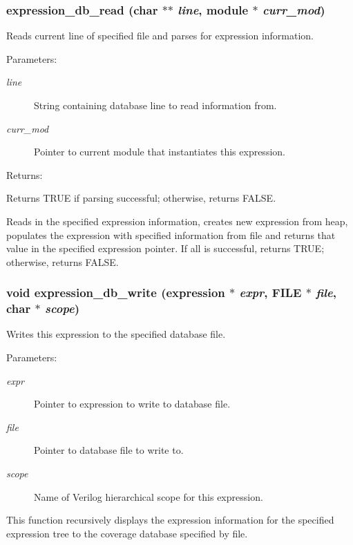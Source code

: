 \subsubsection{ expression\_\-db\_\-read (char $\ast$$\ast$ {\em line}, {\bf module} $\ast$ {\em curr\_\-mod})}\label{expr_8h_a5}


Reads current line of specified file and parses for expression information.

\begin{Desc}
\item[Parameters: ]\par
\begin{description}
\item[{\em 
line}]String containing database line to read information from. \item[{\em 
curr\_\-mod}]Pointer to current module that instantiates this expression.\end{description}
\end{Desc}
\begin{Desc}
\item[Returns: ]\par
Returns TRUE if parsing successful; otherwise, returns FALSE.\end{Desc}
Reads in the specified expression information, creates new expression from heap, populates the expression with specified information from file and  returns that value in the specified expression pointer. If all is  successful, returns TRUE; otherwise, returns FALSE. 
\subsubsection{\setlength{\rightskip}{0pt plus 5cm}void expression\_\-db\_\-write ({\bf expression} $\ast$ {\em expr}, FILE $\ast$ {\em file}, char $\ast$ {\em scope})}\label{expr_8h_a4}


Writes this expression to the specified database file.

\begin{Desc}
\item[Parameters: ]\par
\begin{description}
\item[{\em 
expr}]Pointer to expression to write to database file. \item[{\em 
file}]Pointer to database file to write to. \item[{\em 
scope}]Name of Verilog hierarchical scope for this expression.\end{description}
\end{Desc}
This function recursively displays the expression information for the specified expression tree to the coverage database specified by file. 
